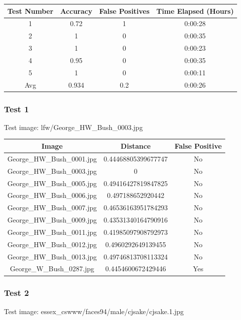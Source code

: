 \documentclass[12pt]{article}
\begin{document}
\begin{center}
\begin{tabular}{cccc}
Test Number & Accuracy & False Positives & Time Elapsed (Hours) \\
\hline
1 & 0.72 & 1 & 0:00:28 \\
2 & 1 & 0 & 0:00:35 \\
3 & 1 & 0 & 0:00:23 \\
4 & 0.95 & 0 & 0:00:35 \\
5 & 1 & 0 & 0:00:11\\
Avg & 0.934 & 0.2 &  0:00:26\\ 
\end{tabular}
\end{center}

\newpage
\subsubsection{Test 1}
Test image: lfw/George\_HW\_Bush\_0003.jpg

\begin{center}
\begin{tabular}{ccc}
Image & Distance & False Positive \\
\hline
George\_HW\_Bush\_0001.jpg & 0.44468805399677747 & No \\
George\_HW\_Bush\_0003.jpg & 0 & No \\
George\_HW\_Bush\_0005.jpg & 0.49416427819847825 & No \\
George\_HW\_Bush\_0006.jpg & 0.497188652920442 & No \\
George\_HW\_Bush\_0007.jpg & 0.46536163951784293 & No \\
George\_HW\_Bush\_0009.jpg & 0.43531340164790916 & No \\
George\_HW\_Bush\_0011.jpg & 0.41985097908792973 & No \\
George\_HW\_Bush\_0012.jpg & 0.4960292649139455 & No \\
George\_HW\_Bush\_0013.jpg & 0.49746813708113324 & No \\
George\_W\_Bush\_0287.jpg & 0.4454600672429446 & Yes \\
\end{tabular}
\end{center}

\subsubsection{Test 2}
Test image: essex\_cswww/faces94/male/cjsake/cjsake.1.jpg
\end{document}
